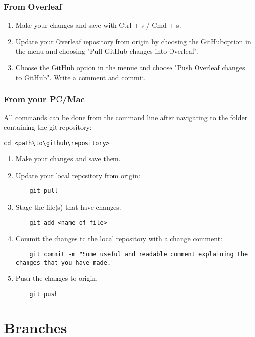 \documentclass{article}
\begin{document}
\subsubsection{From Overleaf}

\begin{enumerate}
    \item Make your changes and save with Ctrl + s / Cmd + s.
    \item Update your Overleaf repository from origin by choosing the GitHuboption in the menu and choosing "Pull GitHub changes into Overleaf".
    \item Choose the GitHub option in the menue and choose "Push Overleaf changes to GitHub". Write a comment and commit.
\end{enumerate}

\subsubsection{From your PC/Mac}
All commands can be done from the command line after navigating to the folder containing the git repository:
\begin{verbatim}
cd <path\to\github\repository>
\end{verbatim}

\begin{enumerate}
    \item Make your changes and save them.
    \item Update your local repository from origin:
	\begin{verbatim}
    git pull   
    \end{verbatim}
	\item Stage the file(s) that have changes.
	\begin{verbatim}
    git add <name-of-file>
    \end{verbatim}
	\item Commit the changes to the local repository with a change comment:
	\begin{verbatim}
    git commit -m "Some useful and readable comment explaining the changes that you have made."
    \end{verbatim}
	\item Push the changes to origin.
	\begin{verbatim}
    git push
    \end{verbatim}
\end{enumerate}

\section{Branches}
\end{document}

